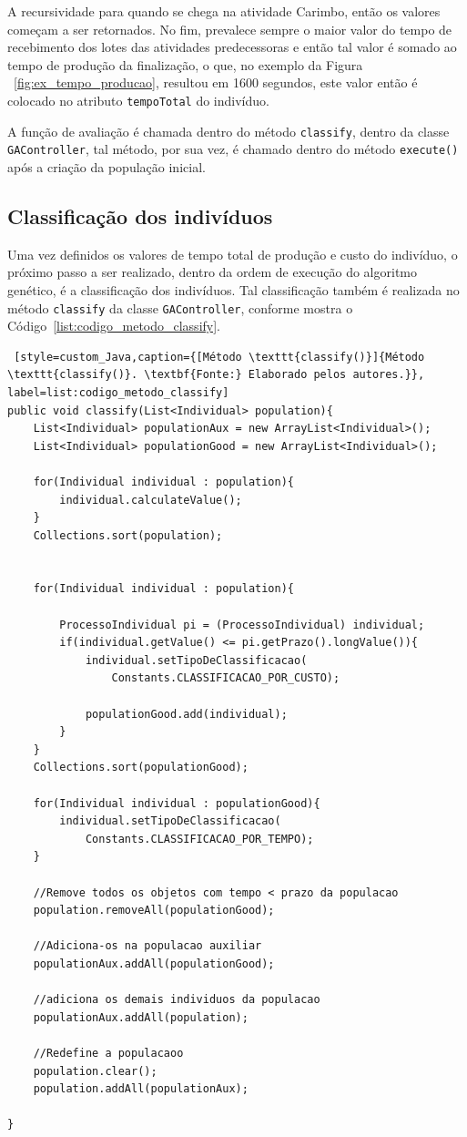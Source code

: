\par A recursividade para quando se chega na atividade Carimbo, então os valores começam a ser retornados.  
No fim, prevalece sempre o maior valor do tempo de recebimento dos lotes das atividades predecessoras e 
então tal valor é somado ao tempo de produção da finalização, o que, no exemplo da Figura ~\ref{fig:ex_tempo_producao}, resultou em 1600 segundos,
este valor então é colocado no atributo \texttt{tempoTotal} do indivíduo.

\par A função de avaliação é chamada dentro do método \texttt{classify}, dentro da classe \texttt{GACont\-roller}, tal método, 
por sua vez, é chamado dentro do método \texttt{execute()} após a criação da população inicial.

\subsection{Classificação dos indivíduos}
\par Uma vez definidos os valores de tempo total de produção e custo do indivíduo, o próximo passo a ser realizado, dentro da
ordem de execução do algoritmo genético, é a classificação dos indivíduos. Tal classificação também é realizada no método 
\texttt{classify} da classe \texttt{GAController}, conforme mostra o Código~\ref{list:codigo_metodo_classify}.


\begin{lstlisting} [style=custom_Java,caption={[Método \texttt{classify()}]{Método \texttt{classify()}. \textbf{Fonte:} Elaborado pelos autores.}}, label=list:codigo_metodo_classify] 
public void classify(List<Individual> population){
	List<Individual> populationAux = new ArrayList<Individual>();
	List<Individual> populationGood = new ArrayList<Individual>();
	
	for(Individual individual : population){
		individual.calculateValue();
	}
	Collections.sort(population);
		
		
	for(Individual individual : population){
			
		ProcessoIndividual pi = (ProcessoIndividual) individual;
		if(individual.getValue() <= pi.getPrazo().longValue()){
			individual.setTipoDeClassificacao(
				Constants.CLASSIFICACAO_POR_CUSTO);
				
			populationGood.add(individual);
		}
	}
	Collections.sort(populationGood);
				
	for(Individual individual : populationGood){
		individual.setTipoDeClassificacao(
			Constants.CLASSIFICACAO_POR_TEMPO);
	}
					
	//Remove todos os objetos com tempo < prazo da populacao
	population.removeAll(populationGood);
				
	//Adiciona-os na populacao auxiliar
	populationAux.addAll(populationGood);
					
	//adiciona os demais individuos da populacao
	populationAux.addAll(population);
				
	//Redefine a populacaoo
	population.clear();
	population.addAll(populationAux);
					
}
						
\end{lstlisting}

